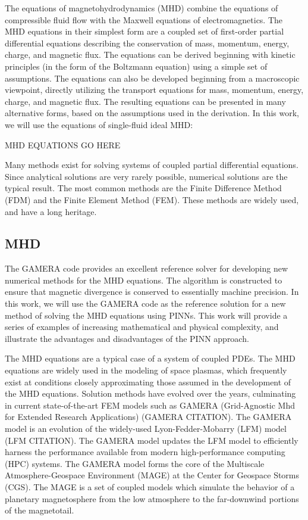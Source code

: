 \documentclass[]{article}
\begin{document}
The equations of magnetohydrodynamics (MHD) combine the equations of compressible fluid flow with the Maxwell equations of electromagnetics. The MHD equations in their simplest form are a coupled set of first-order partial differential equations describing the conservation of mass, momentum, energy, charge, and magnetic flux. The equations can be derived beginning with kinetic principles (in the form of the Boltzmann equation) using a simple set of assumptions. The equations can also be developed beginning from a macroscopic viewpoint, directly utilizing the transport equations for mass, momentum, energy, charge, and magnetic flux. The resulting equations can be presented in many alternative forms, based on the assumptions used in the derivation. In this work, we will use the equations of single-fluid ideal MHD:

MHD EQUATIONS GO HERE

Many methods exist for solving systems of coupled partial differential equations. Since analytical solutions are very rarely possible, numerical solutions are the typical result. The most common methods are the Finite Difference Method (FDM) and the Finite Element Method (FEM). These methods are widely used, and have a long heritage.


\subsection{MHD}

The GAMERA code provides an excellent reference solver for developing new numerical methods for the MHD equations. The algorithm is constructed to ensure that magnetic divergence is conserved to essentially machine precision. In this work, we will use the GAMERA code as the reference solution for a new method of solving the MHD equations using PINNs. This work will provide a series of examples of increasing mathematical and physical complexity, and illustrate the advantages and disadvantages of the PINN approach.


The MHD equations are a typical case of a system of coupled PDEs. The MHD equations are widely used in the modeling of space plasmas, which frequently exist at conditions closely approximating those assumed in the development of the MHD equations. Solution methods have evolved over the years, culminating in current state-of-the-art FEM models such as GAMERA (Grid-Agnostic Mhd for Extended  Research Applications) (GAMERA CITATION). The GAMERA model is an evolution of the widely-used Lyon-Fedder-Mobarry (LFM) model (LFM CITATION). The GAMERA model updates the LFM model to efficiently harness the performance available from modern high-performance computing (HPC) systems. The GAMERA model forms the core of the Multiscale Atmosphere-Geospace Environment (MAGE) at the Center for Geospace Storms (CGS). The MAGE is a set of coupled models which simulate the behavior of a planetary magnetosphere from the low atmosphere to the far-downwind portions of the magnetotail.
\end{document}
